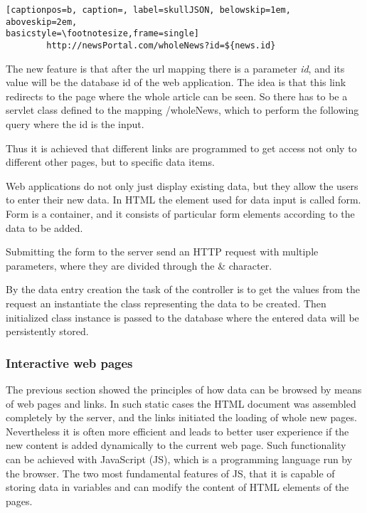 \begin{lstlisting}[captionpos=b, caption=, label=skullJSON, belowskip=1em, aboveskip=2em,
basicstyle=\footnotesize,frame=single]
		http://newsPortal.com/wholeNews?id=${news.id}
\end{lstlisting}


The new feature is that after the url mapping there is a parameter \textit{id}, and its value will be the database id of the web application. The idea is that this link redirects to the page where the whole article can be seen. So there has to be a servlet class defined to the mapping /wholeNews, which to perform the following query where the id is the input.



Thus it is achieved that different links are programmed to get access not only to different other pages, but to specific data items.
  

Web applications do not only just display existing data, but they allow the users to enter their new data. In HTML the element used for data input is called form. Form is a container, and it consists of particular form elements according to the data to be added. 


Submitting the form to the server send an HTTP request with multiple parameters, where they are divided through the \& character.


By the data entry creation the task of the controller is to get the values from the request an instantiate the class representing the data to be created. Then initialized class instance is passed to the database where the entered data will be persistently stored.


\newpage

\subsubsection{Interactive web pages}

The previous section showed the principles of how data can be browsed by means of web pages and links. In such static cases the HTML document was assembled completely by the server, and the links initiated the loading of whole new pages. Nevertheless it is often more efficient and leads to better user experience if the new content is added dynamically to the current web page. Such functionality can be achieved with JavaScript (JS), which is a programming language run by the browser. The two most fundamental features of JS, that it is capable of storing data in variables and can modify the content of HTML elements of the pages. 

